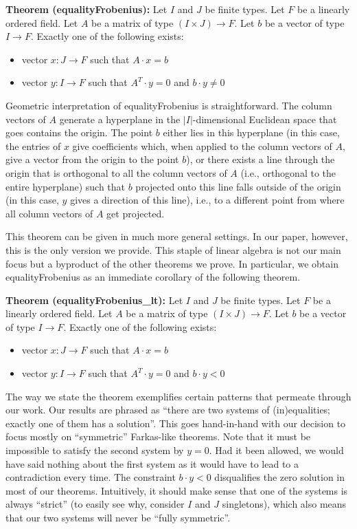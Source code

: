 \documentclass[]{article}
\renewcommand{\.}{\hskip .75pt}
\let\r=\rightarrow
\let\*=\cdot
\begin{document}
\medskip \noindent
\textbf{Theorem (equalityFrobenius):}
Let $I$ and $J$ be finite types.
Let $F$ be a linearly ordered field.
Let $A$ be a matrix of type $(I \times J) \r F$.
Let $b$ be a vector of type $I \r F$.
Exactly one of the following exists:
\begin{itemize}
\item vector $x : J \r F$ such that $A \* x = b$
\item vector $y : I \r F$ such that $A^T\! \* y = 0$ and $b \* y \neq 0$
\end{itemize}
Geometric interpretation of equalityFrobenius is straightforward.
The column vectors of $A$ generate a hyperplane in the
$|I|$-dimensional Euclidean space that goes contains the origin.
The point $b$ either lies in this hyperplane (in this case, the entries
of $x$ give coefficients which, when applied to the column vectors of $A$,
give a vector from the origin to the point $b$),
or there exists a line through the origin that is orthogonal to
all the column vectors of $A$ (i.e., orthogonal to the entire hyperplane)
such that $b$ projected onto this line falls outside of the origin
(in this case, $y$ gives a direction of this line), i.e., to a different point
from where all column vectors of $A$ get projected.

This theorem can be given in much more general settings.
In our paper, however, this is the only version we provide.
This staple of linear algebra is not our main focus
but a byproduct of the other theorems we prove.
In particular, we obtain equalityFrobenius as an immediate corollary
of the following theorem.

\medskip \noindent
\textbf{Theorem (equalityFrobenius\_lt):}
Let $I$ and $J$ be finite types.
Let $F$ be a linearly ordered field.
Let $A$ be a matrix of type $(I \times J) \r F$.
Let $b$ be a vector of type $I \r F$.
Exactly one of the following exists:
\begin{itemize}
\item vector $x : J \r F$ such that $A \* x = b$
\item vector $y : I \r F$ such that $A^T\! \* y = 0$ and $b \* y < 0$
\end{itemize}
The way we state the theorem exemplifies certain patterns that
permeate through our work. Our results are phrased as
``there are two systems of (in)equalities; exactly one of them has a solution''.
This goes hand-in-hand with our decision to focus mostly on ``symmetric'' Farkas-like theorems.
Note that it must be impossible to satisfy the second system by $y=0$.
Had it been allowed, we would have said nothing about the first system as it would
have to lead to a contradiction every time. The constraint $b \* y < 0$ disqualifies
the zero solution in most of our theorems. Intuitively, it should make sense that
one of the systems is always ``strict'' (to easily see why, consider $I$ and $J$ singletons),
which also means that our two systems will never be ``fully symmetric''.
\end{document}
